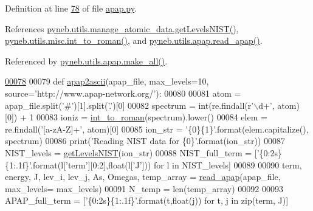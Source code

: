 Definition at line \hyperlink{apap_8py_source_l00078}{78} of file \hyperlink{apap_8py_source}{apap.\-py}.



References \hyperlink{manage__atomic__data_8py_source_l00606}{pyneb.\-utils.\-manage\-\_\-atomic\-\_\-data.\-get\-Levels\-N\-I\-S\-T()}, \hyperlink{misc_8py_source_l00055}{pyneb.\-utils.\-misc.\-int\-\_\-to\-\_\-roman()}, and \hyperlink{apap_8py_source_l00022}{pyneb.\-utils.\-apap.\-read\-\_\-apap()}.



Referenced by \hyperlink{apap_8py_source_l00139}{pyneb.\-utils.\-apap.\-make\-\_\-all()}.


\begin{DoxyCode}
\hypertarget{namespacepyneb_1_1utils_1_1apap_l00078}{}\hyperlink{namespacepyneb_1_1utils_1_1apap_a4fccb2b8771d515b0be6f8a1921c0c58}{00078} 
00079 \textcolor{keyword}{def }\hyperlink{namespacepyneb_1_1utils_1_1apap_a4fccb2b8771d515b0be6f8a1921c0c58}{apap2ascii}(apap\_file, max\_levels=10, source='http://www.apap-network.org/\textcolor{stringliteral}{'):}
00080 \textcolor{stringliteral}{    }
00081 \textcolor{stringliteral}{    atom = apap\_file.split(}\textcolor{stringliteral}{'#'})[1].split(\textcolor{stringliteral}{'.'})[0]
00082     spectrum = int(re.findall(\textcolor{stringliteral}{r'\(\backslash\)d+'}, atom)[0]) + 1
00083     ioniz = \hyperlink{namespacepyneb_1_1utils_1_1misc_a7a4c4b4ba1c884da72e0ea05aa8fb90b}{int\_to\_roman}(spectrum).lower()
00084     elem = re.findall(\textcolor{stringliteral}{'[a-zA-Z]+'}, atom)[0]
00085     ion\_str = \textcolor{stringliteral}{'\{0\}\{1\}'}.format(elem.capitalize(), spectrum)
00086     print(\textcolor{stringliteral}{'Reading NIST data for \{0\}'}.format(ion\_str))
00087     NIST\_levels = \hyperlink{namespacepyneb_1_1utils_1_1manage__atomic__data_ad09376e8676854d44680ae14210b5589}{getLevelsNIST}(ion\_str)
00088     NIST\_full\_term = [\textcolor{stringliteral}{'\{0:2s\}\{1:.1f\}'}.format(l[\textcolor{stringliteral}{'term'}][0:2],float(l[\textcolor{stringliteral}{'J'}])) \textcolor{keywordflow}{for} l \textcolor{keywordflow}{in}  NIST\_levels]
00089     
00090     term, energy, J, lev\_i, lev\_j, As, Omegas, temp\_array = \hyperlink{namespacepyneb_1_1utils_1_1apap_ad24a246526c0913b752319c5a2846412}{read\_apap}(apap\_file, max\_levels=
      max\_levels)
00091     N\_temp = len(temp\_array)
00092 
00093     APAP\_full\_term = [\textcolor{stringliteral}{'\{0:2s\}\{1:.1f\}'}.format(t,float(j)) \textcolor{keywordflow}{for} t, j \textcolor{keywordflow}{in} zip(term, J)]

\end{DoxyCode}
